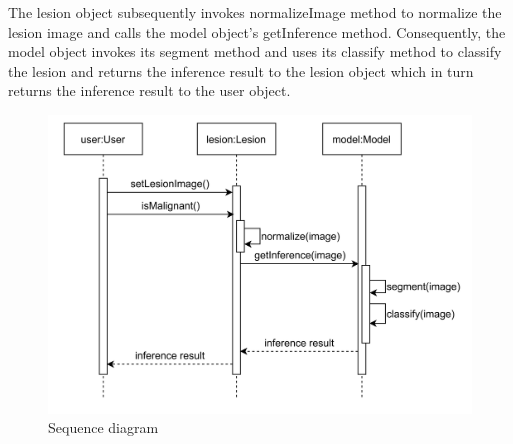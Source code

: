\documentclass[12pt, a4paper]{article}
\begin{document}
The lesion object subsequently invokes normalizeImage method to normalize the lesion image and calls the model object's getInference method. Consequently, the model object invokes its segment method and uses its classify method to classify the lesion and returns the inference result to the lesion object which in turn returns the inference result to the user object.
\begin{figure}[h]
    \centering
    \setlength{\fboxsep}{8pt}
    \includegraphics[scale=0.15, fbox]{sequence-diagram.png}
    \caption{Sequence diagram}
    \label{fig:sequence-diagram}
\end{figure}
\end{document}
